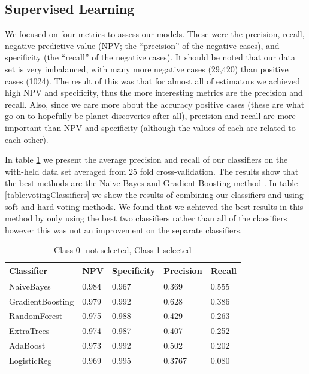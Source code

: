 \subsection{Supervised Learning}

We focused on four metrics to assess our models. These were the precision, recall, negative predictive value (NPV; the ``precision'' of the negative cases), and specificity (the ``recall'' of the negative cases).  It should be noted that our data set is very imbalanced, with many more negative cases (29,420) than positive cases (1024). The result of this was that for almost all of estimators we achieved high NPV and specificity, thus the more interesting metrics are the precision and recall.  Also, since we care more about the accuracy positive cases (these are what go on to hopefully be planet discoveries after all), precision and recall are more important than NPV and specificity (although the values of each are related to each other).

In table \ref{table:classifiers} we present the average precision and recall of our classifiers on the with-held data set averaged from $25$ fold cross-validation. The results show that the best methods are the Naive Bayes and Gradient Boosting method . In table \ref{table:votingClassifiers} we show the results of combining our classifiers and using soft and hard voting methods. We found that we achieved the best results in this method by only using the best two classifiers rather than all of the classifiers however this was not an improvement on the separate classifiers.

\begin{table}
 \begin{tabular}{|l |l |l |l |l |}
\hline
Classifier &NPV & Specificity &Precision & Recall  \\ \hline
 NaiveBayes & 0.984 &  0.967&  0.369 & 0.555 \\ 
GradientBoosting & 0.979 & 0.992 &  0.628 & 0.386\\
RandomForest & 0.975 &  0.988 & 0.429&  0.263 \\
ExtraTrees & 0.974 & 0.987 &  0.407& 0.252 \\
AdaBoost & 0.973&  0.992 & 0.502& 0.202 \\
LogisticReg &0.969 &  0.995& 0.3767 &  0.080\\\hline
\end{tabular}
\caption{Class 0 -not selected, Class 1 selected}
\label{table:classifiers}
\end{table}


